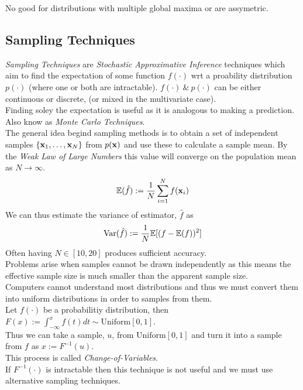 \documentclass[11pt,a4paper]{article}
\begin{document}
No good for distributions with multiple global maxima or are assymetric.\\

\subsection{Sampling Techniques}

\textit{Sampling Techniques} are \textit{Stochastic Approximative Inference} techniques which aim to find the expectation of some function $f(\cdot)$ wrt a proability distribution $p(\cdot)$ (where one or both are intractable). $f(\cdot)\ \&\ p(\cdot)$ can be either continuous or discrete, (or mixed in the multivariate case).\\
\nb Finding soley the expectation is useful as it is analogous to making a prediction.\\
\nb Also know as \textit{Monte Carlo Techniques}.\\

The general idea begind sampling methods is to obtain a set of independent samples $\{\textbf{x}_1,\dots,\textbf{x}_N\}$ from $p(\textbf{x})$ and use these to calculate a sample mean. By the \textit{Weak Law of Large Numbers} this value will converge on the population mean as $N\to\infty$.
$$\mathbb{E}(\hat f):=\frac1N\sum_{i=1}^Nf(\textbf{x}_i)$$
We can thus estimate the variance of estimator, $\hat f$ as
$$\mathrm{Var}(\hat f):=\frac{1}{N}\mathbb{E}[(f-\mathbb{E}(f))^2]$$
\nb Often having $N\in[10,20]$ produces sufficient accuracy.\\
\nb Problems arise when samples cannot be drawn independently as this means the effective sample size is much smaller than the apparent sample size.\\

Computers cannot understand most distributions and thus we must convert them into uniform distributions in order to samples from them.\\
Let $f(\cdot)$ be a probabilitiy distribution, then $F(x):=\displaystyle\int_{-\infty}^xf(t)dt\sim\text{Uniform}[0,1]$.\\
Thus we can take a sample, $u$, from $\text{Uniform}[0,1]$ and turn it into a sample from $f$ as $x:=F^{-1}(u)$.\\
\nb This process is called \textit{Change-of-Variables}.\\
\nb If $F^{-1}(\cdot)$ is intractable then this technique is not useful and we must use alternative sampling techniques.\\
\end{document}
